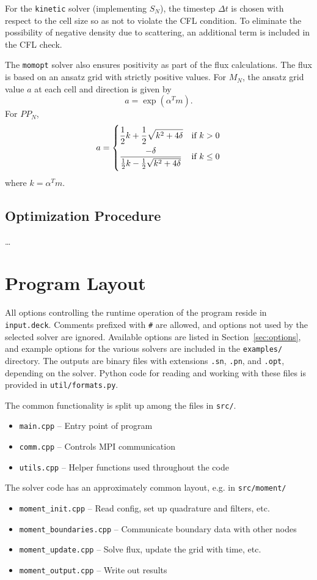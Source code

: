 \documentclass{article}
\newcommand{\kinetic}{\texttt{kinetic}\xspace}
\newcommand{\momopt}{\texttt{momopt}\xspace}
\begin{document}
For the \kinetic solver (implementing $S_N$), the timestep
$\Delta t$ is chosen with respect to the cell size so as not to violate
the CFL condition. To eliminate the possibility of negative density due
to scattering, an additional term is included in the CFL check. %

The \momopt solver also ensures positivity as part of the flux calculations.
The flux is based on an ansatz grid with strictly positive values. For $M_N$,
the ansatz grid value $a$ at each cell and direction is given by
\begin{equation}
    a = \exp (\alpha^T m).
\end{equation}
For $PP_N$,
\begin{equation}
a =
\begin{dcases}
    \frac{1}{2}k + \frac{1}{2}\sqrt{k^2 + 4\delta} & \text{if } k > 0 \\
    \frac{-\delta}{\frac{1}{2}k - \frac{1}{2}\sqrt{k^2 + 4\delta}} & \text{if } k \leq 0
\end{dcases}
\end{equation}
where $k = \alpha^T m$.

\subsection{Optimization Procedure}
\dots

\section{Program Layout}
All options controlling the runtime operation of the program reside in
\texttt{input.deck}. Comments prefixed with \texttt{\#} are allowed,
and options not used by the selected solver are ignored. Available options are
listed in Section~\ref{sec:options}, and example options for the various
solvers are included in the \texttt{examples/} directory.
The outputs are binary files with
extensions \texttt{.sn}, \texttt{.pn}, and \texttt{.opt}, depending on
the solver. Python code for reading and working with these files is provided
in \texttt{util/formats.py}.

The common functionality is split up among the files in \texttt{src/}.
\begin{itemize}
 \item \texttt{main.cpp} -- Entry point of program
 \item \texttt{comm.cpp} -- Controls MPI communication
 \item \texttt{utils.cpp} -- Helper functions used throughout the code
 \end{itemize}
The solver code has an approximately common layout, e.g. in \texttt{src/moment/}
\begin{itemize}
 \item \texttt{moment\_init.cpp} -- Read config, set up quadrature and filters, etc.
 \item \texttt{moment\_boundaries.cpp} -- Communicate boundary data with other nodes
 \item \texttt{moment\_update.cpp} -- Solve flux, update the grid with time, etc.
 \item \texttt{moment\_output.cpp} -- Write out results
\end{itemize}
\end{document}
